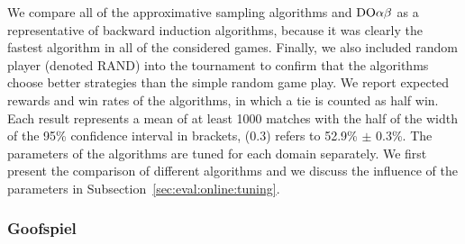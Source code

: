 We compare all of the approximative sampling algorithms and $\textrm{DO}\alpha\beta$ as a representative of backward induction algorithms, because it was clearly the fastest algorithm in all of the considered games. 
Finally, we also included random player (denoted RAND) into the tournament to confirm that the algorithms choose better strategies than the simple random game play.
We report expected rewards and win rates of the algorithms, in which a tie is counted as half win.
Each result represents a mean of at least 1000 matches with the half of the width of the 95\% confidence interval in brackets, (0.3) refers to 52.9\% $\pm$ 0.3\%. 
The parameters of the algorithms are tuned for each domain separately.
We first present the comparison of different algorithms and we discuss the influence of the parameters in Subsection~\ref{sec:eval:online:tuning}.

\subsubsection{Goofspiel}


